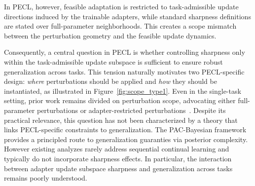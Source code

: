 \documentclass{article}
\theoremstyle{plain}
\theoremstyle{definition}
\theoremstyle{remark}
\begin{document}
In PECL, however, feasible adaptation is restricted to task-admissible update directions induced by the trainable adapters, while standard sharpness definitions are stated over full-parameter neighborhoods. This creates a scope mismatch between the perturbation geometry and the feasible update dynamics.


Consequently, a central question in PECL is whether controlling sharpness only within the task-admissible update subspace is sufficient to ensure robust generalization across tasks.  This tension naturally motivates two PECL-specific design: \emph{where} perturbations should be applied and \emph{how} they should be instantiated, as illustrated in Figure~\ref{fig:scope_type1}.
Even in the single-task setting, prior work remains divided on perturbation scope, advocating either full-parameter perturbations or adapter-restricted perturbations~\citep{NEURIPS2024_4eb2c0ad,li2025flatloralowrankadaptationflat}.
Despite its practical relevance, this question has not been characterized by a theory that links PECL-specific constraints to generalization.
The PAC-Bayesian framework~\cite{mcallesterPACBayesianStochasticModel2003,PAC-Bayesiansupervisedclassification2007,pentinaPACBayesianBoundLifelong2014,germainPACBayesianTheoryMeets2016,lotfiPACBayesCompressionBounds2022} provides a principled route to generalization guaranties via posterior complexity. However existing analyzes rarely address sequential continual learning and typically do not incorporate sharpness effects.
In particular, the interaction between adapter update subspace sharpness and generalization across tasks remains poorly understood.
\end{document}
